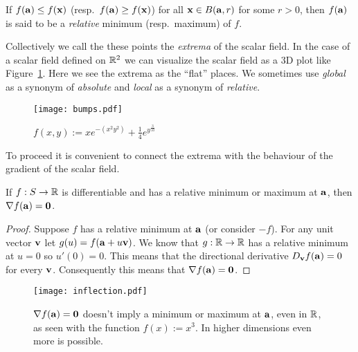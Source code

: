\begin{definition}
    If \(f(\aa)\leq f(\xx)\) (resp.\ \(f(\aa)\geq f(\xx)\)) for all \(\xx \in B(\aa,r)\) for some \(r>0\), then \(f(\aa)\) is said to be a \emph{relative} minimum (resp.\ maximum) of \(f\).
\end{definition}

Collectively we call the these points the \emph{extrema} of the scalar field.
In the case of a scalar field defined on \(\bR^2\) we can visualize the scalar field as a 3D plot like Figure~\ref{fig:bumps}.
Here we see the extrema as the ``flat'' places.
We sometimes use \emph{global} as a synonym of \emph{absolute} and \emph{local} as a synonym of \emph{relative}.


\begin{figure}[htbp]
    \begin{center}
        \texttt{[image: bumps.pdf]}
        \caption{$f(x,y) := x e^{-(x^2y^2)}  + \frac{1}{4}e^{y^\frac{3}{10}}$}
        \label{fig:bumps}
    \end{center}
\end{figure}

To proceed it is convenient to connect the extrema with the behaviour of the gradient of the scalar field.

\begin{theorem}
    \label{thm:is-stationary}
    If \(f:S\to\bR\) is differentiable and has a relative minimum or maximum at \(\aa\), then \(\nabla f(\aa)=  \mathbf{0}\).
\end{theorem}

\begin{proof}
    Suppose \(f\) has a relative minimum at \(\aa\) (or consider \(-f\)).
    For any unit vector \(\vv\) let \(g(u) = f(\aa+u\vv)\).
    We know that \(g:\bR \to \bR\) has a relative minimum at \(u=0\) so \(u'(0)=0\).
    This means that the directional derivative \(D_{\vv} f(\aa) = 0\) for every \(\vv\).
    Consequently this means that \(\nabla f (\aa)= \mathbf{0}\).
\end{proof}

\begin{figure}[htbp]
    \begin{center}
        \texttt{[image: inflection.pdf]}
        \caption{\(\nabla f(\aa) =  \mathbf{0}\) doesn't imply a minimum or maximum at \(\aa\), even in \(\bR\), as seen with the function \(f(x):=x^3\). In higher dimensions even more is possible.}
        \label{fig:inflection}
    \end{center}
\end{figure}

